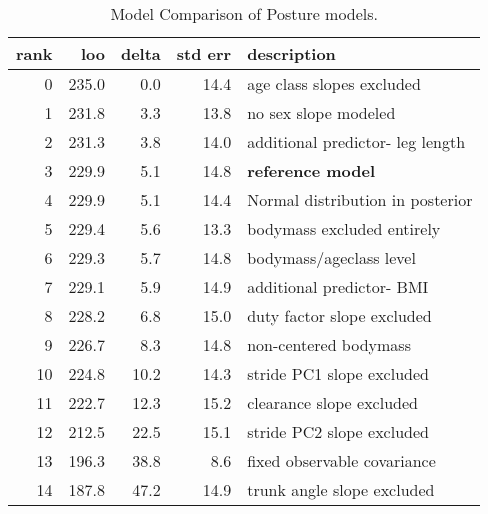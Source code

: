 \begin{table}[p]
\caption{\label{tab:posturemodelcomparison}Model Comparison of Posture models.}
\centering
\begin{tabular}{rrrrl}
\textbf{rank} & \textbf{loo} & \textbf{delta} & \textbf{std err} & \textbf{description}\\[0pt]
\hline
0 & 235.0 & 0.0 & 14.4 & age class slopes excluded\\[0pt]
1 & 231.8 & 3.3 & 13.8 & no sex slope modeled\\[0pt]
2 & 231.3 & 3.8 & 14.0 & additional predictor- leg length\\[0pt]
3 & 229.9 & 5.1 & 14.8 & \textbf{reference model}\\[0pt]
4 & 229.9 & 5.1 & 14.4 & Normal distribution in posterior\\[0pt]
5 & 229.4 & 5.6 & 13.3 & bodymass excluded entirely\\[0pt]
6 & 229.3 & 5.7 & 14.8 & bodymass/ageclass level\\[0pt]
7 & 229.1 & 5.9 & 14.9 & additional predictor- BMI\\[0pt]
8 & 228.2 & 6.8 & 15.0 & duty factor slope excluded\\[0pt]
9 & 226.7 & 8.3 & 14.8 & non-centered bodymass\\[0pt]
10 & 224.8 & 10.2 & 14.3 & stride PC1 slope excluded\\[0pt]
11 & 222.7 & 12.3 & 15.2 & clearance slope excluded\\[0pt]
12 & 212.5 & 22.5 & 15.1 & stride PC2 slope excluded\\[0pt]
13 & 196.3 & 38.8 & 8.6 & fixed observable covariance\\[0pt]
14 & 187.8 & 47.2 & 14.9 & trunk angle slope excluded\\[0pt]
\end{tabular}
\end{table}

